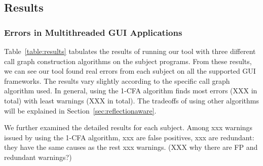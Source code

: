 \begin{table*}[ht]
\begin{center}
\begin{tabular}{|l||c|c|c||c|c|c||c|c|c||c|c|}
\hline
\end{tabular}
\end{center}
\vspace{-15pt}
\end{table*}

\subsection{Results}
\label{sec:results}


\subsubsection{Errors in Multithreaded GUI Applications}
\label{sec:errors}

Table~\ref{table:results} tabulates the results of running our
tool with three different call graph construction algorithms
on the subject programs. From these results, we can see our
tool found real errors from each subject on all the 
supported GUI frameworks. The results vary slightly according
to the specific call graph algorithm used. In general, using
the 1-CFA algorithm finds most errors (XXX in total) with least
warnings (XXX in total). The tradeoffs of using other
algorithms will be explained in Section~\ref{sec:reflectionaware}.

We further examined the detailed results for each subject.
Among xxx warnings issued by using the 1-CFA algorithm, xxx
are false positives, xxx are redundant:
they have the same causes as the rest xxx warnings. (XXX why there
are FP and redundant warnings?)



